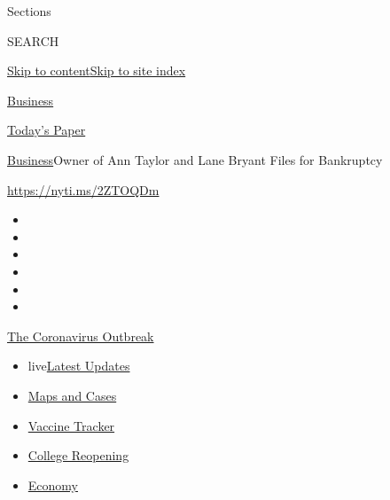 Sections

SEARCH

\protect\hyperlink{site-content}{Skip to
content}\protect\hyperlink{site-index}{Skip to site index}

\href{https://www.nytimes3xbfgragh.onion/section/business}{Business}

\href{https://myaccount.nytimes3xbfgragh.onion/auth/login?response_type=cookie\&client_id=vi}{}

\href{https://www.nytimes3xbfgragh.onion/section/todayspaper}{Today's
Paper}

\href{/section/business}{Business}\textbar{}Owner of Ann Taylor and Lane
Bryant Files for Bankruptcy

\href{https://nyti.ms/2ZTOQDm}{https://nyti.ms/2ZTOQDm}

\begin{itemize}
\item
\item
\item
\item
\item
\item
\end{itemize}

\href{https://www.nytimes3xbfgragh.onion/news-event/coronavirus?action=click\&pgtype=Article\&state=default\&region=TOP_BANNER\&context=storylines_menu}{The
Coronavirus Outbreak}

\begin{itemize}
\tightlist
\item
  live\href{https://www.nytimes3xbfgragh.onion/2020/08/03/world/coronavirus-covid-19.html?action=click\&pgtype=Article\&state=default\&region=TOP_BANNER\&context=storylines_menu}{Latest
  Updates}
\item
  \href{https://www.nytimes3xbfgragh.onion/interactive/2020/us/coronavirus-us-cases.html?action=click\&pgtype=Article\&state=default\&region=TOP_BANNER\&context=storylines_menu}{Maps
  and Cases}
\item
  \href{https://www.nytimes3xbfgragh.onion/interactive/2020/science/coronavirus-vaccine-tracker.html?action=click\&pgtype=Article\&state=default\&region=TOP_BANNER\&context=storylines_menu}{Vaccine
  Tracker}
\item
  \href{https://www.nytimes3xbfgragh.onion/2020/08/02/us/covid-college-reopening.html?action=click\&pgtype=Article\&state=default\&region=TOP_BANNER\&context=storylines_menu}{College
  Reopening}
\item
  \href{https://www.nytimes3xbfgragh.onion/live/2020/08/03/business/stock-market-today-coronavirus?action=click\&pgtype=Article\&state=default\&region=TOP_BANNER\&context=storylines_menu}{Economy}
\end{itemize}

